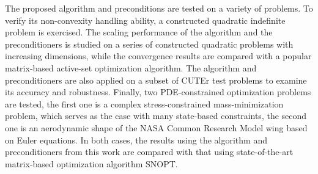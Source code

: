 The proposed algorithm and preconditions are tested on a variety of problems. To verify its non-convexity handling ability, a constructed quadratic indefinite problem is exercised. The scaling performance of the algorithm and the preconditioners is studied on a series of constructed quadratic problems with increasing dimensions, while the convergence results are compared with a popular matrix-based active-set optimization algorithm. The algorithm and preconditioners are also applied on a subset of CUTEr test problems to examine its accuracy and robustness. Finally, two PDE-constrained optimization problems are tested, the first one is a complex stress-constrained mass-minimization problem, which serves as the case with many state-based constraints, the second one is an aerodynamic shape of the NASA Common Research Model wing based on Euler equations. In both cases, the results using the algorithm and preconditioners from this work are compared with that using state-of-the-art matrix-based optimization algorithm SNOPT. 

